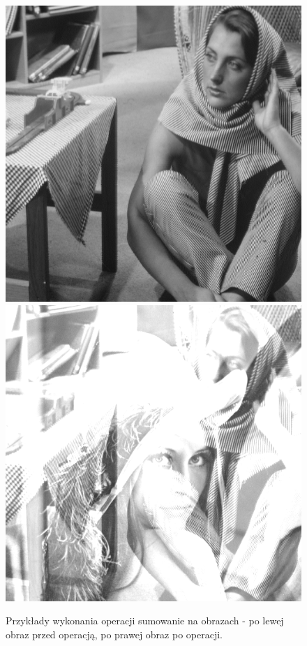 \documentclass{article}
\begin{document}
\begin{figure}[!htb]
\includegraphics[scale=0.2]{img/barbara_8bit.png} 
\includegraphics[scale=0.2]{img/_Sumowanie_Obrazka__barbara_8bit_lena_8bit.png}
\caption{Przykłady wykonania operacji sumowanie na obrazach - po lewej obraz przed operacją, po prawej obraz po operacji. }
\label{fig:verticalcell}
\end{figure}
\end{document}
